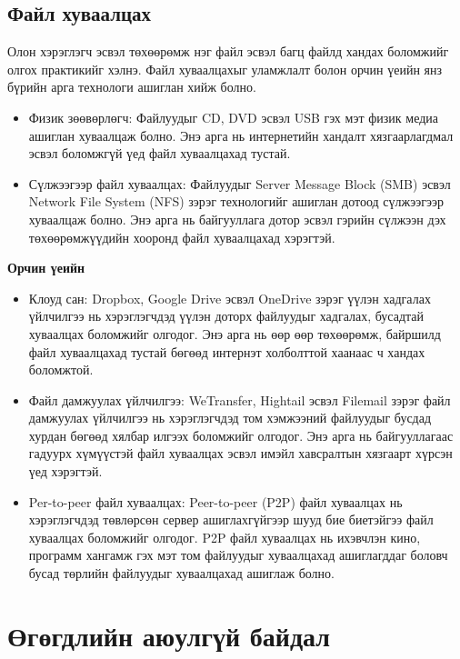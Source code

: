 \subsection{Файл хуваалцах}
Олон хэрэглэгч эсвэл төхөөрөмж нэг файл эсвэл багц файлд хандах боломжийг олгох практикийг хэлнэ. Файл хуваалцахыг уламжлалт болон орчин үеийн янз бүрийн арга технологи ашиглан хийж болно.

\begin{itemize}
    \item Физик зөөвөрлөгч: Файлуудыг CD, DVD эсвэл USB гэх мэт физик медиа ашиглан хуваалцаж болно. Энэ арга нь интернетийн хандалт хязгаарлагдмал эсвэл боломжгүй үед файл хуваалцахад тустай.
    \item Сүлжээгээр файл хуваалцах: Файлуудыг Server Message Block (SMB) эсвэл Network File System (NFS) зэрэг технологийг ашиглан дотоод сүлжээгээр хуваалцаж болно. Энэ арга нь байгууллага дотор эсвэл гэрийн сүлжээн дэх төхөөрөмжүүдийн хооронд файл хуваалцахад хэрэгтэй.
\end{itemize}

\textbf{Орчин үеийн}
\begin{itemize}
    \item Клоуд сан: Dropbox, Google Drive эсвэл OneDrive зэрэг үүлэн хадгалах үйлчилгээ нь хэрэглэгчдэд үүлэн доторх файлуудыг хадгалах, бусадтай хуваалцах боломжийг олгодог. Энэ арга нь өөр өөр төхөөрөмж, байршилд файл хуваалцахад тустай бөгөөд интернэт холболттой хаанаас ч хандах боломжтой.
    \item Файл дамжуулах үйлчилгээ: WeTransfer, Hightail эсвэл Filemail зэрэг файл дамжуулах үйлчилгээ нь хэрэглэгчдэд том хэмжээний файлуудыг бусдад хурдан бөгөөд хялбар илгээх боломжийг олгодог. Энэ арга нь байгууллагаас гадуурх хүмүүстэй файл хуваалцах эсвэл имэйл хавсралтын хязгаарт хүрсэн үед хэрэгтэй.
    \item Per-to-peer файл хуваалцах: Peer-to-peer (P2P) файл хуваалцах нь хэрэглэгчдэд төвлөрсөн сервер ашиглахгүйгээр шууд бие биетэйгээ файл хуваалцах боломжийг олгодог. P2P файл хуваалцах нь ихэвчлэн кино, программ хангамж гэх мэт том файлуудыг хуваалцахад ашиглагддаг боловч бусад төрлийн файлуудыг хуваалцахад ашиглаж болно.
\end{itemize}

\section{Өгөгдлийн аюулгүй байдал}

